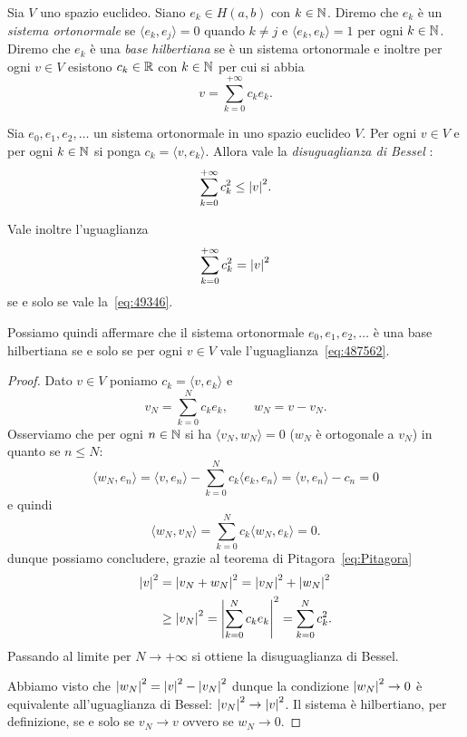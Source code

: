 \begin{definition}
Sia $V$ uno spazio euclideo. Siano $e_k\in H(a,b)$ con $k\in {\mathbb N}$. Diremo che
$e_k$ è un \emph{sistema ortonormale}%
 se $\langle e_k, e_j\rangle = 0$ quando
$k\neq j$ e $\langle e_k, e_k\rangle = 1$ per ogni $k\in {\mathbb N}$.
Diremo che $e_k$ è una \emph{base hilbertiana}%
 se è un sistema ortonormale
e inoltre per ogni $v\in V$
esistono $c_k\in {\mathbb R}$ con $k\in{\mathbb N}$ per cui si abbia
\begin{equation}\label{eq:49346}
  v = \sum_{k=0}^{+\infty} c_k e_k.
\end{equation}
\end{definition}

\begin{theorem}
\label{th:bessel}%
Sia $e_0, e_1, e_2, \dots$ un sistema ortonormale in uno spazio euclideo $V$.
Per ogni $v\in V$ e per ogni $k\in {\mathbb N}$ si ponga $c_k = \langle v,e_k\rangle$.
Allora vale la
\emph{disuguaglianza di Bessel}%
:
\begin{equation}\label{eq:disuguaglianza_Bessel}
\sum_{k=0}^{+\infty} c_k^2 \le {\left|v\right|}^2.
\end{equation}

Vale inoltre l'uguaglianza
\begin{equation}\label{eq:487562}
\sum_{k=0}^{+\infty} c_k^2 = {\left|v\right|}^2
\end{equation}
se e solo se vale la~\eqref{eq:49346}.

Possiamo quindi affermare che il sistema ortonormale $e_0, e_1, e_2, \dots$
è una base hilbertiana se e solo se per ogni $v\in V$ vale l'uguaglianza~\eqref{eq:487562}.
\end{theorem}
%
\begin{proof}
Dato $v\in V$ poniamo $c_k = \langle v,e_k\rangle$ e
\[
   v_N = \sum_{k=0}^N c_k e_k, \qquad w_N = v - v_N.
\]
Osserviamo che per ogni $n\in {\mathbb N}$ si ha $\langle v_N,w_N\rangle=0$
($w_N$ è ortogonale a $v_N$)
in quanto se $n\le N$:
\[
  \langle w_N , e_n \rangle
  = \langle v, e_n\rangle - \sum_{k=0}^N c_k \langle e_k, e_n\rangle
  = \langle v,e_n\rangle - c_n = 0
\]
e quindi
\[
 \langle w_N, v_N \rangle = \sum_{k=0}^N c_k \langle w_N, e_k\rangle = 0.
\]
dunque possiamo concludere, grazie al teorema di Pitagora~\eqref{eq:Pitagora}
\begin{align*}
  {\left|v\right|}^2
  &= {\left|v_N + w_N\right|}^2
  = {\left|v_N\right|}^2 + {\left|w_N\right|}^2 \\
  &\ge {\left|v_N\right|}^2 = {\left|\sum_{k=0}^N c_k e_k\right|}^2
  = \sum_{k=0}^N c_k^2.
\end{align*}
Passando al limite per $N\to +\infty$ si ottiene la disuguaglianza
di Bessel.

Abbiamo visto che ${\left|w_N\right|}^2 = {\left|v\right|}^2 - {\left|v_N\right|}^2$
dunque la condizione ${\left|w_N\right|}^2\to 0$ è equivalente
all'uguaglianza di Bessel: ${\left|v_N\right|}^2 \to {\left|v\right|}^2$.
Il sistema è hilbertiano, per definizione, se e solo se $v_N \to v$
ovvero se $w_N\to 0$.
\end{proof}

